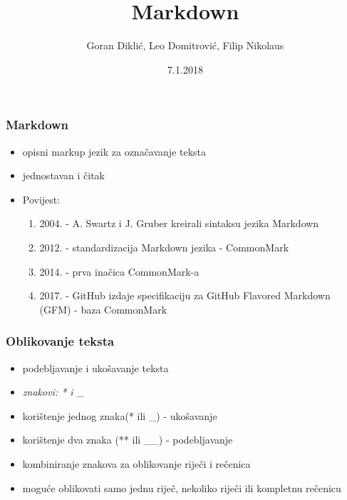 \documentclass{beamer}
\title{Markdown}
\author{Goran Diklić, Leo Domitrović, Filip Nikolaus}
\date{7.1.2018}
\begin{document}
\maketitle

\newpage

\begin{frame}
\frametitle{Markdown}

\begin{itemize}
\item opisni markup jezik za označavanje teksta
\item jednostavan i čitak
\item Povijest:
\begin{enumerate}
\item 2004. - A. Swartz i J. Gruber kreirali sintaksu jezika Markdown
\item 2012. - standardizacija Markdown jezika - CommonMark
\item 2014. - prva inačica CommonMark-a
\item 2017. - GitHub izdaje specifikaciju za GitHub Flavored Markdown
(GFM) - baza CommonMark
\end{enumerate}

	
\end{itemize}
\end{frame}

\newpage

\begin{frame}
\frametitle{Oblikovanje teksta}
\begin{itemize}
\item podebljavanje i ukošavanje teksta
\item \emph{znakovi: * i  \_}
\item korištenje jednog znaka(* ili \_) - ukošavanje
\item korištenje dva znaka (** ili \_\_) - podebljavanje
\item kombiniranje znakova za oblikovanje riječi i rečenica
\item moguće oblikovati samo jednu riječ, nekoliko riječi ili kompletnu rečenicu
\end{itemize}
\end{frame}

\newpage
\end{document}
